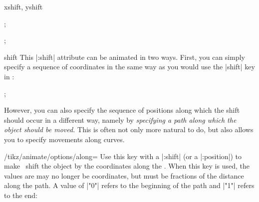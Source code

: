 \begin{tikzanimateattribute}{xshift, yshift}
\begin{codeexample}[animation list={0.5,1,1.5,2}]
\tikz {}; 
\end{codeexample}
\begin{codeexample}[animation list={0.5,1,1.5,2}]
\tikz {}; 
\end{codeexample}
\end{tikzanimateattribute}

\begin{tikzanimateattribute}{shift}
  This |:shift| attribute can be animated in two ways. First, you can
  simply specify a sequence of coordinates in the same way as you
  would use the |shift| key in \tikzname:
\begin{codeexample}[animation list={0.5,1,1.5,2}]
\tikz {}; 
\end{codeexample}

  However, you can also specify the sequence of positions along which
  the shift should occur in a different way, namely by
  \emph{specifying a path along which the object should be moved.}
  This is often not only more natural to do, but also allows you to
  specify movements along curves. 
  
  \begin{key}{/tikz/animate/options/along=}
    Use this key with a |:shift| (or a |:position|) to make \tikzname\
    shift the object by the coordinates along the . When
    this key is used, the values are may no longer be 
    coordinates, but must be fractions of the distance along the 
    path. A value of |"0"| refers to the beginning of the path and |"1"|
    refers to the end:
\begin{codeexample}[animation list={0.5,1,1.5,2}]
\end{codeexample}
  \end{key}


\end{tikzanimateattribute}
